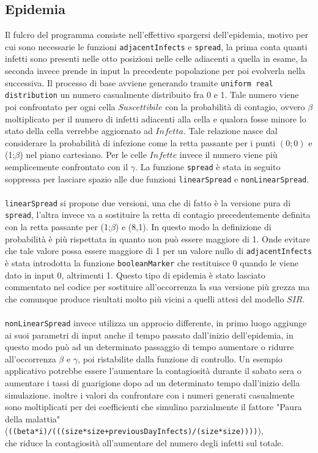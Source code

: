\documentclass[a4paper]{article}
\begin{document}
\subsection{Epidemia}
Il fulcro del programma consiste nell'effettivo spargersi dell'epidemia, motivo per cui sono necessarie le funzioni \texttt{adjacentInfects} e \texttt{spread}, la prima conta quanti infetti sono presenti nelle otto posizioni nelle celle adiacenti a quella in esame, la seconda invece prende in input la precedente popolazione per poi evolverla nella successiva. Il processo di base avviene generando tramite \texttt{uniform real distribution} un numero casualmente distribuito fra 0 e 1. Tale numero viene poi confrontato per ogni cella $Suscettibile$ con la probabilità di contagio, ovvero $\beta$ moltiplicato per il numero di infetti adiacenti alla cella e qualora fosse minore lo stato della cella verrebbe aggiornato ad $Infetta$. Tale relazione nasce dal considerare la probabilità di infezione come la retta passante per i punti $(0;0)$ e (1;$\beta$) nel piano cartesiano. Per le celle $Infette$ invece il numero viene più semplicemente confrontato con il $\gamma$. La funzione \texttt{spread} è stata in seguito soppressa per lasciare spazio alle due funzioni \texttt{linearSpread} e \texttt{nonLinearSpread}.\\ \\ \texttt{linearSpread} si propone due versioni, una che di fatto è la versione pura di \texttt{spread}, l'altra invece va a sostituire la retta di contagio precedentemente definita con la retta passante per (1;$\beta$) e (8,1). In questo modo la definizione di probabilità è più rispettata in quanto non può essere maggiore di 1. Onde evitare che tale valore possa essere maggiore di 1 per un valore nullo di \texttt{adjacentInfects} è stata introdotta la funzione \texttt{booleanMarker} che restituisce 0 quando le viene dato in input 0, altrimenti 1. Questo tipo di epidemia è stato lasciato commentato nel codice per sostituire all'occorrenza la sua versione più grezza ma che comunque produce risultati molto più vicini a quelli attesi del modello $SIR$.\\ \\
\texttt{nonLinearSpread} invece utilizza un approcio differente, in primo luogo aggiunge ai suoi parametri di input anche il tempo passato dall'inizio dell'epidemia, in questo modo può ad un determinato passaggio di tempo aumentare o ridurre all'occorrenza $\beta$ e $\gamma$, poi ristabilite dalla funzione di controllo. Un esempio applicativo potrebbe essere l'aumentare la contagiosità durante il sabato sera o aumentare i tassi di guarigione dopo ad un determinato tempo dall'inizio della simulazione. inoltre i valori da confrontare con i numeri generati casualmente sono moltiplicati per dei coefficienti che simulino parzialmente il fattore "Paura della malattia"\\ (\texttt{((beta*i)/(((size*size+previousDayInfects)/(size*size))))}),\\ che riduce la contagiosità all'aumentare del numero degli infetti sul totale.  \\
\end{document}
